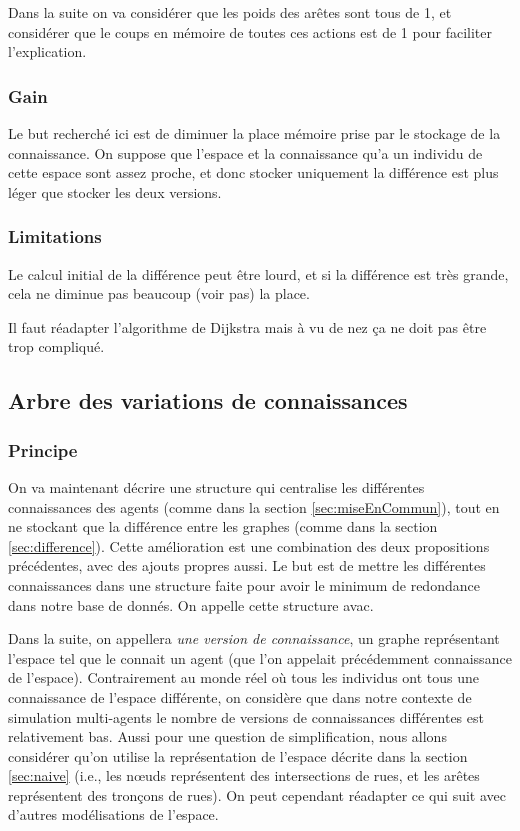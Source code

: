 \documentclass[a4paper]{article}
\begin{document}
Dans la suite on va considérer que les poids des arêtes sont tous de 1, et
considérer que le coups en mémoire de toutes ces actions est de 1 pour faciliter
l'explication.

    \subsubsection{Gain}

Le but recherché ici est de diminuer la place mémoire prise par le stockage de
la connaissance. On suppose que l'espace et la connaissance qu'a un individu de
cette espace sont assez proche, et donc stocker uniquement la différence est
plus léger que stocker les deux versions.

    \subsubsection{Limitations}

Le calcul initial de la différence peut être lourd, et si la différence est très
grande, cela ne diminue pas beaucoup (voir pas) la place.

Il faut réadapter l'algorithme de Dijkstra mais à vu de nez ça ne doit pas être
trop compliqué.

  \subsection{Arbre des variations de connaissances}

    \subsubsection{Principe}

On va maintenant décrire une structure qui centralise les différentes
connaissances des agents (comme dans la section \ref{sec:miseEnCommun}), tout en
ne stockant que la différence entre les graphes (comme dans la section
\ref{sec:difference}). Cette amélioration est une combination des deux
propositions précédentes, avec des ajouts propres aussi. Le but est de mettre
les différentes connaissances dans une structure faite pour avoir le minimum de
redondance dans notre base de donnés. On appelle cette structure \gls{avac}.

Dans la suite, on appellera \emph{une version de connaissance}, un graphe
représentant l'espace tel que le connait un agent (que l'on appelait
précédemment connaissance de l'espace). Contrairement au monde réel où tous les
individus ont tous une connaissance de l'espace différente, on considère que
dans notre contexte de simulation multi-agents le nombre de versions de
connaissances différentes est relativement bas. Aussi pour une question de
simplification, nous allons considérer qu'on utilise la représentation de
l'espace décrite dans la section \ref{sec:naive} (i.e., les nœuds représentent
des intersections de rues, et les arêtes représentent des tronçons de rues). On
peut cependant réadapter ce qui suit avec d'autres modélisations de l'espace.
\end{document}
